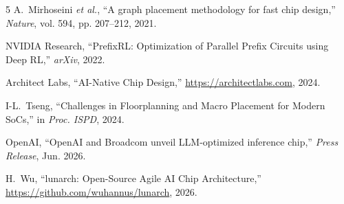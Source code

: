 \documentclass[conference]{IEEEtran}
\begin{document}
\begin{thebibliography}{5}
A.~Mirhoseini \textit{et al.}, ``A graph placement methodology for fast chip design,'' \textit{Nature}, vol. 594, pp. 207--212, 2021.

NVIDIA Research, ``PrefixRL: Optimization of Parallel Prefix Circuits using Deep RL,'' \textit{arXiv}, 2022.

Architect Labs, ``AI-Native Chip Design,'' \url{https://architectlabs.com}, 2024.

I-L.~Tseng, ``Challenges in Floorplanning and Macro Placement for Modern SoCs,'' in \textit{Proc. ISPD}, 2024.

OpenAI, ``OpenAI and Broadcom unveil LLM-optimized inference chip,'' \textit{Press Release}, Jun. 2026.

H.~Wu, ``lunarch: Open-Source Agile AI Chip Architecture,'' \url{https://github.com/wuhannus/lunarch}, 2026.
\end{thebibliography}
\end{document}
